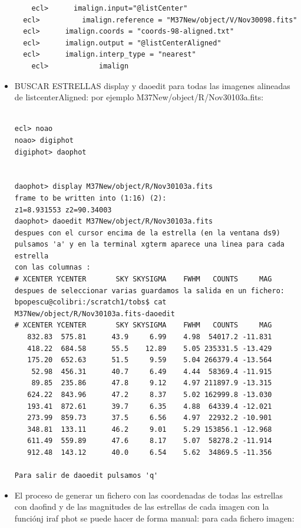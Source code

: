 \documentclass{article}
\begin{document}
\begin{itemize}
\begin{verbatim}
 	ecl>      imalign.input="@listCenter"   
  ecl>  		imalign.reference = "M37New/object/V/Nov30098.fits" 
  ecl>     	imalign.coords = "coords-98-aligned.txt" 
  ecl>    	imalign.output = "@listCenterAligned" 
  ecl>    	imalign.interp_type = "nearest" 
	ecl>			imalign
\end{verbatim}

\item  BUSCAR ESTRELLAS
display y daoedit para todas las imagenes alineadas de listcenterAligned: por ejemplo M37New/object/R/Nov30103a.fits:

\begin{verbatim}

ecl> noao
noao> digiphot
digiphot> daophot


daophot> display M37New/object/R/Nov30103a.fits
frame to be written into (1:16) (2): 
z1=8.931553 z2=90.34003
daophot> daoedit M37New/object/R/Nov30103a.fits
despues con el cursor encima de la estrella (en la ventana ds9) pulsamos 'a' y en la terminal xgterm aparece una linea para cada estrella
con las columnas :
# XCENTER YCENTER       SKY SKYSIGMA    FWHM   COUNTS     MAG
despues de seleccionar varias guardamos la salida en un fichero:
bpopescu@colibri:/scratch1/tobs$ cat M37New/object/R/Nov30103a.fits-daoedit 
# XCENTER YCENTER       SKY SKYSIGMA    FWHM   COUNTS     MAG
   832.83  575.81      43.9     6.99    4.98  54017.2 -11.831
   418.22  684.58      55.5    12.89    5.05 235331.5 -13.429
   175.20  652.63      51.5     9.59    5.04 266379.4 -13.564
    52.98  456.31      40.7     6.49    4.44  58369.4 -11.915
    89.85  235.86      47.8     9.12    4.97 211897.9 -13.315
   624.22  843.96      47.2     8.37    5.02 162999.8 -13.030
   193.41  872.61      39.7     6.35    4.88  64339.4 -12.021
   273.99  859.73      37.5     6.56    4.97  22932.2 -10.901
   348.81  133.11      46.2     9.01    5.29 153856.1 -12.968
   611.49  559.89      47.6     8.17    5.07  58278.2 -11.914
   912.48  143.12      40.0     6.54    5.62  34869.5 -11.356

Para salir de daoedit pulsamos 'q'

\end{verbatim}

\item El proceso de generar un fichero con las coordenadas de todas las estrellas con daofind y de las magnitudes de las estrellas de cada imagen con la funciónj iraf phot se puede hacer de forma manual: para cada fichero imagen:
\begin{description}


\end{description}
\end{itemize}
\end{document}
